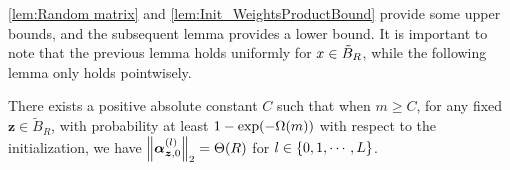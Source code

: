 \cref{lem:Random matrix} and \cref{lem:Init_WeightsProductBound} provide some upper bounds, and the subsequent lemma provides a lower bound.
It is important to note that the previous lemma holds uniformly for $x\in\tilde{B}_R$, while the following lemma only holds pointwisely.

\begin{lemma}
  \label{lem:Init_LayerOutputBounds}
  There exists a positive absolute constant $C$ such that when $m\geq C$, for any fixed $\bm{z}\in\tilde{B}_R$, 
  with probability at least $1-\exp\xkm{-\Omega(m)}$ with respect to the initialization, we have $\norm{{\bm{\alpha}}^{(l)}_{\bm{z},0}}_{2} =\Theta(R)$ for $l\in\left\{0,1,\cdots,L\right\}$.



\end{lemma}
